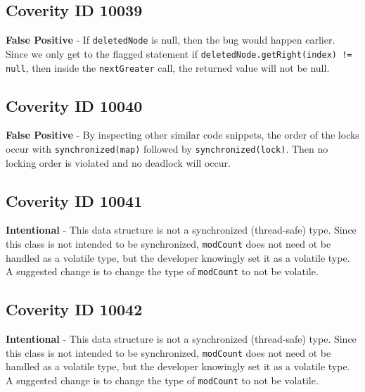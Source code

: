 \documentclass[12pt]{article}
\begin{document}
\subsection{Coverity ID 10039}
\textbf{False Positive} - If \texttt{deletedNode} is null, then the bug would happen earlier. Since we only get to the flagged statement if \texttt{deletedNode.getRight(index) != null}, then inside the \texttt{nextGreater} call, the returned value will not be null.
\subsection{Coverity ID 10040}
\textbf{False Positive} - By inspecting other similar code snippets, the order of the locks occur with \texttt{synchronized(map)} followed by \texttt{synchronized(lock)}. Then no locking order is violated and no deadlock will occur.
\subsection{Coverity ID 10041}
\textbf{Intentional} - This data structure is not a synchronized (thread-safe) type. Since this class is not intended to be synchronized, \texttt{modCount} does not need ot be handled as a volatile type, but the developer knowingly set it as a volatile type. A suggested change is to change the type of \texttt{modCount} to not be volatile.
\subsection{Coverity ID 10042}
\textbf{Intentional} - This data structure is not a synchronized (thread-safe) type. Since this class is not intended to be synchronized, \texttt{modCount} does not need ot be handled as a volatile type, but the developer knowingly set it as a volatile type. A suggested change is to change the type of \texttt{modCount} to not be volatile.
\end{document}
